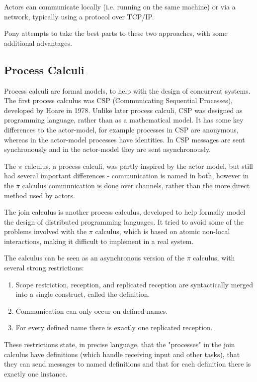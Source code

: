 \documentclass[pdftex,11pt,a4paper]{report}
\begin{document}
Actors can communicate locally (i.e. running on the same machine) or via a network, typically using a protocol over TCP/IP.

Pony attempts to take the best parts to these two approaches, with some additional advantages.

\subsection{Process Calculi}

Process calculi are formal models, to help with the design of concurrent systems.
The first process calculus was CSP (Communicating Sequential Processes), developed by Hoare in 1978\cite{hoare1978}.
Unlike later process calculi, CSP was designed as programming language, rather than as a mathematical model.
It has some key differences to the actor-model, for example processes in CSP are anonymous, whereas in the actor-model processes have identities.
In CSP messages are sent synchronously and in the actor-model they are sent asynchronously.

The $\pi$ calculus, a process calculi, was partly inspired by the actor model, but still had several important differences - communication is named in both, however in the $\pi$ calculus communication is done over channels, rather than the more direct method used by actors.

The join calculus is another process calculus, developed to help formally model the design of distributed programming languages\cite{fournet1996}.
It tried to avoid some of the problems involved with the $\pi$ calculus\cite{milner1989}, which is based on atomic non-local interactions, making it difficult to implement in a real system.

The calculus can be seen as an asynchronous version of the $\pi$ calculus, with several strong restrictions\cite{fournet1996}:
\begin{enumerate}[noitemsep]
	\item Scope restriction, reception, and replicated reception are syntactically merged into a single construct, called the definition.
	\item Communication can only occur on defined names.
	\item For every defined name there is exactly one replicated reception.
\end{enumerate}

These restrictions state, in precise language, that the "processes" in the join calculus have definitions (which handle receiving input and other tasks), that they can send messages to named definitions and that for each definition there is exactly one instance.
\end{document}

